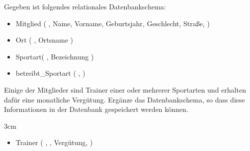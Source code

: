 \question[3]
Gegeben ist folgendes relationales Datenbankschema:


\begin{itemize}
\item Mitglied ( , Name, Vorname, Geburtsjahr, Geschlecht, Straße,  )
\item Ort ( , Ortsname )
\item Sportart( , Bezeichnung )
\item betreibt\_Sportart ( ,  )
\end{itemize}

Einige der Mitglieder sind Trainer einer oder mehrerer Sportarten und erhalten dafür eine
monatliche Vergütung. Ergänze das Datenbankschema, so dass diese Informationen in der Datenbank
gespeichert werden können.


\begin{solutionbox}{3cm}  

\begin{itemize}
\item Trainer ( , , Vergütung,  )
\end{itemize}


\end{solutionbox}